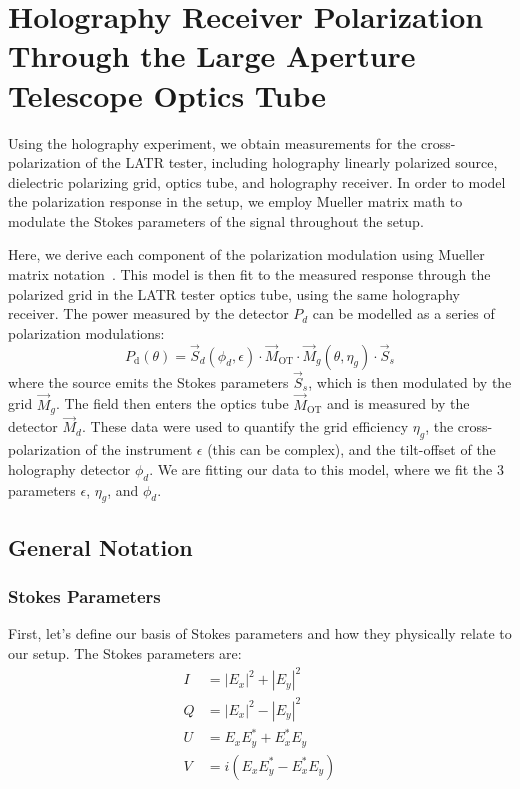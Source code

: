 \chapter{Holography Receiver Polarization Through the Large Aperture Telescope Optics Tube} 
\label{app:pol} 
Using the holography experiment, we obtain measurements for the cross-polarization of the LATR tester, including holography linearly polarized source, dielectric polarizing grid, optics tube, and holography receiver.  In order to model the polarization response in the setup, we employ Mueller matrix math to modulate the Stokes parameters of the signal throughout the setup.  

Here, we derive each component of the polarization modulation using Mueller matrix notation~\cite{MUELLER}.  This model is then fit to the measured response through the polarized grid in the LATR tester optics tube, using the same holography receiver.  The power measured by the detector $P_{d}$ can be modelled as a series of polarization modulations: 
\begin{equation}
    P_{\text{d}}(\theta) = \vec{S}_{d}(\phi_{d},\epsilon)\cdot \vec{M}_{\text{OT}}\cdot \vec{M}_{g}(\theta,\eta_{g})\cdot \vec{S}_{s}
    \label{eq:holo_model}
\end{equation}
where the source emits the Stokes parameters $\vec{S}_{s}$, which is then modulated by the grid $\vec{M}_{g}$.  The field then enters the optics tube $\vec{M}_{\text{OT}}$ and is measured by the detector $\vec{M}_{d}$.  These data were used to quantify the grid efficiency $\eta_{g}$, the cross-polarization of the instrument $\epsilon$ (this can be complex), and the tilt-offset of the holography detector $\phi_{d}$.  We are fitting our data to this model, where we fit the 3 parameters $\epsilon$, $\eta_{g}$, and $\phi_{d}$.
\section{General Notation}
\subsection{Stokes Parameters}
First, let's define our basis of Stokes parameters and how they physically relate to our setup.  The Stokes parameters are:
\begin{equation}
\begin{split}
    I & = |E_x|^2 + |E_y|^2 \\
    Q & = |E_x|^2 - |E_y|^2 \\
    U & = E_x E_y^* + E_x^*E_y\\
    V & = i(E_x E_y^* - E_x^*E_y) \\
\end{split}
\end{equation}
